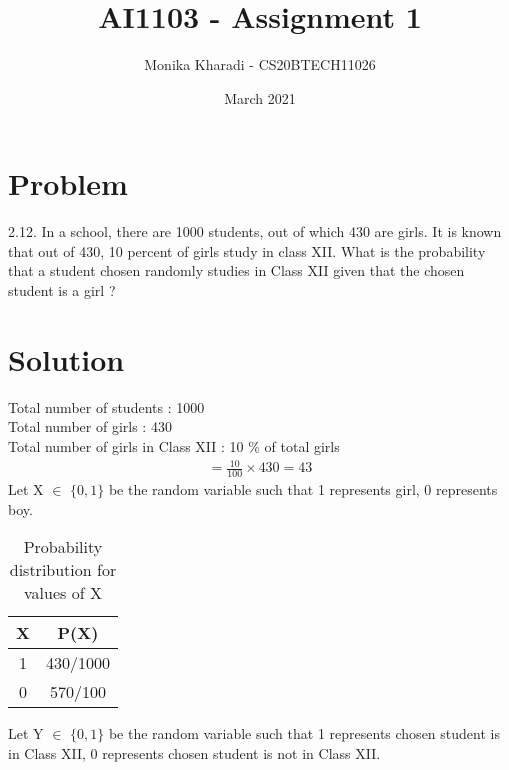 \documentclass[journal,12pt,two column]{IEEEtran}
\title{AI1103 - Assignment 1}
\author{Monika Kharadi - CS20BTECH11026}
\date{March 2021}
\begin{document}
\maketitle
\section*{\large\textbf{Problem}}

2.12. In a school, there are 1000 students, out of which 430 are girls. It is known that out of 430, 10 percent of girls study in class XII. What is the probability that a student chosen randomly studies in Class XII given that the chosen student is a girl ?
{\section*{\large\textbf{Solution}}}
Total number of students : 1000 \\
Total number of girls : 430  \\
Total number of girls in Class XII : 10 \% of total girls 
\begin{align}
=\frac{10}{100}\times 430 =43
\end{align}
Let X $\in$ $\{0,1\}$ be the random variable such that 1 represents girl, 0 represents boy.
\begin{table}[ht]
\caption{Probability distribution for values of X}
\label{table:0}
\begin{center}
\begin{tabular}{|c|c|}
    \hline
    X & P(X) \\
    \hline
    1 & 430/1000\\
    \hline
    0 & 570/100\\
    \hline
    \end{tabular} 
\end{center}   
\end{table}

Let Y $\in$ $\{0,1\}$ be the random variable such that 1 represents chosen student is in Class XII, 0 represents chosen student is not in Class XII.
\end{document}

